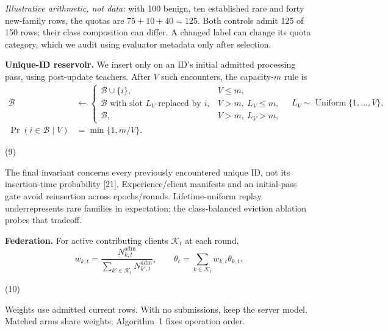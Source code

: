 \documentclass[10pt,a4paper]{article}
\begin{document}
\emph{Illustrative arithmetic, not data:} with 100 benign, ten established rare and forty new-family rows, the quotas are $75+10+40=125$. Both controls admit 125 of 150 rows; their class composition can differ. A changed label can change its quota category, which we audit using evaluator metadata only after selection.

\textbf{Unique-ID reservoir.} We insert only on an ID's initial admitted processing pass, using post-update teachers. After $V$ such encounters, the capacity-$m$ rule is
\begin{equation}
\begin{aligned}
\mathcal B&\leftarrow\begin{cases}
\mathcal B\cup\{i\},&V\le m,\\
\mathcal B\text{ with slot }L_V\text{ replaced by }i,&V>m,\ L_V\le m,\\
\mathcal B,&V>m,\ L_V>m,
\end{cases}\quad L_V\sim\operatorname{Uniform}\{1,\ldots,V\},\\
\Pr(i\in\mathcal B\mid V)&=\min\{1,m/V\}.
\end{aligned}

\end{equation}
\par\hfill(9)\par

The final invariant concerns every previously encountered unique ID, not its insertion-time probability [21]. Experience/client manifests and an initial-pass gate avoid reinsertion across epochs/rounds. Lifetime-uniform replay underrepresents rare families in expectation; the class-balanced eviction ablation probes that tradeoff.

\textbf{Federation.} For active contributing clients $\mathcal K_t$ at each round,
\begin{equation}
w_{k,t}=\frac{N^{\mathrm{adm}}_{k,t}}{\sum_{k'\in\mathcal K_t}N^{\mathrm{adm}}_{k',t}},\qquad
\theta_t=\sum_{k\in\mathcal K_t}w_{k,t}\theta_{k,t}.

\end{equation}
\par\hfill(10)\par

Weights use admitted current rows. With no submissions, keep the server model. Matched arms share weights; Algorithm~1 fixes operation order.
\end{document}
